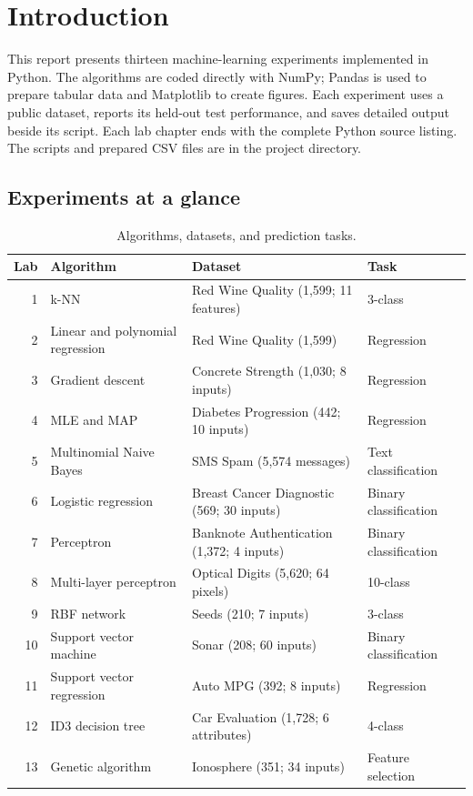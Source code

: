 \chapter*{Introduction}

This report presents thirteen machine-learning experiments implemented in Python.
The algorithms are coded directly with NumPy; Pandas is used to prepare tabular
data and Matplotlib to create figures. Each experiment uses a public dataset,
reports its held-out test performance, and saves detailed output beside its
script. Each lab chapter ends with the complete Python source listing. The
scripts and prepared CSV files are in the project directory.

\section*{Experiments at a glance}
\begin{table}[H]
\centering\small
\caption{Algorithms, datasets, and prediction tasks.}
\begin{tabularx}{\linewidth}{@{}r l X l@{}}
\toprule
\textbf{Lab} & \textbf{Algorithm} & \textbf{Dataset} & \textbf{Task}\\
\midrule
1 & k-NN & Red Wine Quality (1,599; 11 features) & 3-class\\
2 & Linear and polynomial regression & Red Wine Quality (1,599) & Regression\\
3 & Gradient descent & Concrete Strength (1,030; 8 inputs) & Regression\\
4 & MLE and MAP & Diabetes Progression (442; 10 inputs) & Regression\\
5 & Multinomial Naive Bayes & SMS Spam (5,574 messages) & Text classification\\
6 & Logistic regression & Breast Cancer Diagnostic (569; 30 inputs) & Binary classification\\
7 & Perceptron & Banknote Authentication (1,372; 4 inputs) & Binary classification\\
8 & Multi-layer perceptron & Optical Digits (5,620; 64 pixels) & 10-class\\
9 & RBF network & Seeds (210; 7 inputs) & 3-class\\
10 & Support vector machine & Sonar (208; 60 inputs) & Binary classification\\
11 & Support vector regression & Auto MPG (392; 8 inputs) & Regression\\
12 & ID3 decision tree & Car Evaluation (1,728; 6 attributes) & 4-class\\
13 & Genetic algorithm & Ionosphere (351; 34 inputs) & Feature selection\\
\bottomrule
\end{tabularx}
\end{table}

